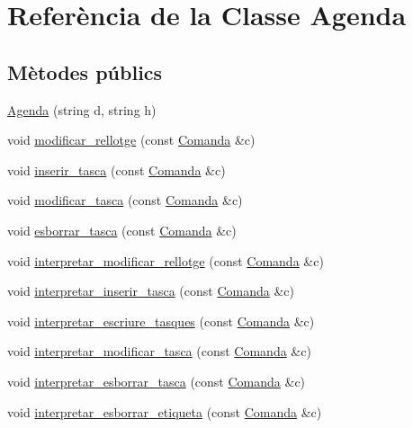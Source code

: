 \hypertarget{class_agenda}{\section{Referència de la Classe Agenda}
\label{class_agenda}
}
\subsection*{Mètodes públics}
\begin{DoxyCompactItemize}
\item 
\hyperlink{class_agenda_a5c7b532b714bfbbe10e6be529160b45b}{Agenda} (string d, string h)
\item 
void \hyperlink{class_agenda_a9682676ce90d55251713aaf5d155f170}{modificar\-\_\-rellotge} (const \hyperlink{class_comanda}{Comanda} \&c)
\item 
void \hyperlink{class_agenda_a059521520bbff1406580f43870b7e6b0}{inserir\-\_\-tasca} (const \hyperlink{class_comanda}{Comanda} \&c)
\item 
void \hyperlink{class_agenda_a71ed63bb50f305d366ec34fe040de8e6}{modificar\-\_\-tasca} (const \hyperlink{class_comanda}{Comanda} \&c)
\item 
void \hyperlink{class_agenda_a8dff51b098687e4c0c1eb8f30de2fa67}{esborrar\-\_\-tasca} (const \hyperlink{class_comanda}{Comanda} \&c)
\item 
void \hyperlink{class_agenda_aabd932aa3bf3d31c8b285c1df820cb03}{interpretar\-\_\-modificar\-\_\-rellotge} (const \hyperlink{class_comanda}{Comanda} \&c)
\item 
void \hyperlink{class_agenda_ae0fbad6af5d4132169b2daadacb8ea42}{interpretar\-\_\-inserir\-\_\-tasca} (const \hyperlink{class_comanda}{Comanda} \&c)
\item 
void \hyperlink{class_agenda_ac09bb2bf7cf5d1d6d4c30d4c021ada34}{interpretar\-\_\-escriure\-\_\-tasques} (const \hyperlink{class_comanda}{Comanda} \&c)
\item 
void \hyperlink{class_agenda_a02f6c89125af8bc3f4851ce169dd5f73}{interpretar\-\_\-modificar\-\_\-tasca} (const \hyperlink{class_comanda}{Comanda} \&c)
\item 
void \hyperlink{class_agenda_a07ef0637cc544831204b75d7e03f75f5}{interpretar\-\_\-esborrar\-\_\-tasca} (const \hyperlink{class_comanda}{Comanda} \&c)
\item 
void \hyperlink{class_agenda_a77526b8f1b285b6e6d948454c80ed4d4}{interpretar\-\_\-esborrar\-\_\-etiqueta} (const \hyperlink{class_comanda}{Comanda} \&c)
\item 

\end{DoxyCompactItemize}
